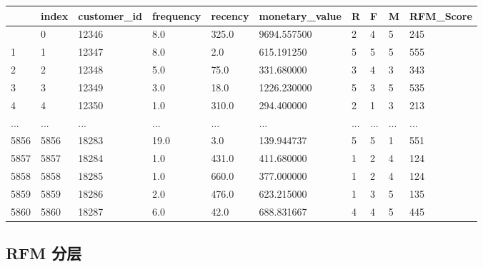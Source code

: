 \documentclass[
]{ctexart}
\newcounter{none} %
\begin{document}
{\def\LTcaptype{none} %
\begin{longtable}[]{@{}llllllllll@{}}
\toprule\noalign{}
& index & customer\_id & frequency & recency & monetary\_value & R & F &
M & RFM\_Score \\
\midrule\noalign{}
\endhead
\bottomrule\noalign{}
\endlastfoot
0 & 0 & 12346 & 8.0 & 325.0 & 9694.557500 & 2 & 4 & 5 & 245 \\
1 & 1 & 12347 & 8.0 & 2.0 & 615.191250 & 5 & 5 & 5 & 555 \\
2 & 2 & 12348 & 5.0 & 75.0 & 331.680000 & 3 & 4 & 3 & 343 \\
3 & 3 & 12349 & 3.0 & 18.0 & 1226.230000 & 5 & 3 & 5 & 535 \\
4 & 4 & 12350 & 1.0 & 310.0 & 294.400000 & 2 & 1 & 3 & 213 \\
... & ... & ... & ... & ... & ... & ... & ... & ... & ... \\
5856 & 5856 & 18283 & 19.0 & 3.0 & 139.944737 & 5 & 5 & 1 & 551 \\
5857 & 5857 & 18284 & 1.0 & 431.0 & 411.680000 & 1 & 2 & 4 & 124 \\
5858 & 5858 & 18285 & 1.0 & 660.0 & 377.000000 & 1 & 2 & 4 & 124 \\
5859 & 5859 & 18286 & 2.0 & 476.0 & 623.215000 & 1 & 3 & 5 & 135 \\
5860 & 5860 & 18287 & 6.0 & 42.0 & 688.831667 & 4 & 4 & 5 & 445 \\
\end{longtable}
}

\subsection{RFM 分层}\label{rfm-ux5206ux5c42}
\end{document}
